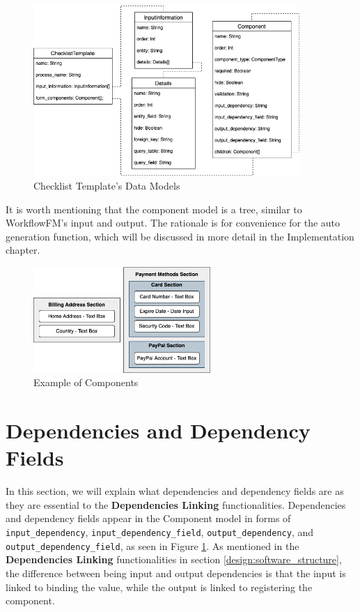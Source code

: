 \begin{figure}[ht!]
    \centering
    \includegraphics[width=0.9\textwidth]{overleaf/images/data_models.png}
    \caption{Checklist Template's Data Models}
    \label{fig:data_models}
\end{figure}

It is worth mentioning that the component model is a tree, similar to WorkflowFM's input and output. The rationale is for convenience for the auto generation function, which will be discussed in more detail in the Implementation chapter.

\begin{figure}[ht!]
    \centering
    \includegraphics[width=0.6\textwidth]{overleaf/images/component_example.png}
    \caption{Example of Components}
    \label{fig:component_example}
\end{figure}

\section{Dependencies and Dependency Fields}
\label{dependencies}
In this section, we will explain what dependencies and dependency fields are as they are essential to the \textbf{Dependencies Linking} functionalities. Dependencies and dependency fields appear in the Component model in forms of \verb!input_dependency!, \verb!input_dependency_field!, \verb!output_dependency!, and \verb!output_dependency_field!, as seen in Figure \ref{fig:data_models}.
As mentioned in the \textbf{Dependencies Linking} functionalities in section \ref{design:software_structure}, the difference between being input and output dependencies is that the input is linked to binding the value, while the output is linked to registering the component.

